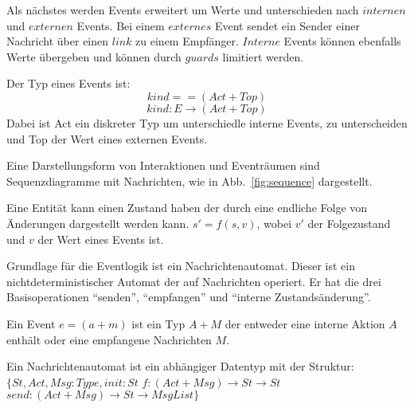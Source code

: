 Als nächstes werden Events erweitert um Werte und unterschieden nach
$internen$ und $externen$ Events. Bei einem $externes$ Event sendet ein Sender
einer Nachricht über einen $link$ zu einem Empfänger. $Interne$ Events können
ebenfalls Werte übergeben und können durch $guards$ limitiert werden.~\cite{bickford2005causal}

\begin{defi}
  Der Typ eines Events ist:
  \[
    kind == (Act+Top)
  \]
  \[
    kind: E\rightarrow (Act+Top)
  \]
  Dabei ist Act ein diskreter Typ um unterschiedle interne Events, zu
  unterscheiden und Top der Wert eines externen Events.
\end{defi}

Eine Darstellungsform von Interaktionen und Eventräumen sind Sequenzdiagramme
mit Nachrichten, wie in Abb.~\ref{fig:sequence} dargestellt.


\begin{defi}
  Eine Entität kann einen Zustand haben der durch eine endliche Folge
  von Änderungen dargestellt werden kann. $s'=f(s,v)$, wobei
  $v'$ der Folgezustand und $v$ der Wert eines Events ist.  
\end{defi}



Grundlage für die Eventlogik ist ein Nachrichtenautomat. Dieser ist ein
nichtdeterministischer Automat der auf Nachrichten operiert.
Er hat die drei Basisoperationen ``senden'', ``empfangen'' und ``interne
Zustandsänderung''.~\cite{bickford2003logic}

\begin{defi}
  Ein Event $e=(a+m)$ ist ein Typ $A+M$ der entweder eine interne Aktion $A$ enthält
  oder eine empfangene Nachrichten $M$.
\end{defi}

\begin{defi}
  Ein Nachrichtenautomat ist ein abhängiger Datentyp mit der Struktur:
  $\{St, Act, Msg: Type, init: St$
    $f:(Act+Msg)\rightarrow St\rightarrow St$
    $send:(Act+Msg)\rightarrow St\rightarrow MsgList\}$  
\end{defi}

